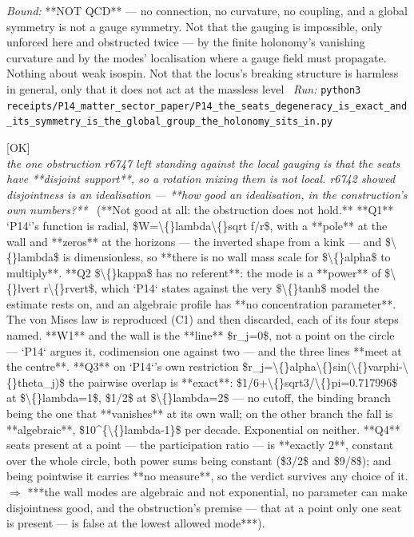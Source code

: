 \begin{description}
 \emph{Bound:}  **NOT QCD** --- no connection, no curvature, no coupling, and a global symmetry is not a gauge symmetry. Not that the gauging is impossible, only unforced here and obstructed twice --- by the finite holonomy's vanishing curvature and by the modes' localisation where a gauge field must propagate. Nothing about weak isospin. Not that the locus's breaking structure is harmless in general, only that it does not act at the massless level
\ \emph{Run:} \texttt{python3 receipts/P14\_matter\_sector\_paper/P14\_the\_seats\_degeneracy\_is\_exact\_and\_its\_symmetry\_is\_the\_global\_group\_the\_holonomy\_sits\_in.py}
\item[\rcptlabel{P14_the_walls_modes_are_algebraic_not_exponential_so_the_disjointness_obstruction_does_not_hold}{P14R91}\textbf{P14R91}\quad\texttt{P14\_the\_walls\_modes\_are\_algebraic\_not\_exponential\_so\_the\_disjointness\_obstruction\_does\_not\_hold}]\hfill\textsf{[OK]}\\
\textit{the one obstruction r6747 left standing against the local gauging is that the seats have **disjoint support**, so a rotation mixing them is not local. r6742 showed disjointness is an idealisation --- **how good an idealisation, in the construction's own numbers?**} \ (**Not good at all: the obstruction does not hold.**  **Q1** `P14`'s function is radial, \$W=\textbackslash\{\}lambda\textbackslash\{\}sqrt f/r\$, with a **pole** at the wall and **zeros** at the horizons --- the inverted shape from a kink --- and \$\textbackslash\{\}lambda\$ is dimensionless, so **there is no wall mass scale for \$\textbackslash\{\}alpha\$ to multiply**.  **Q2 \$\textbackslash\{\}kappa\$ has no referent**: the mode is a **power** of \$\textbackslash\{\}lvert r\textbackslash\{\}rvert\$, which `P14` states against the very \$\textbackslash\{\}tanh\$ model the estimate rests on, and an algebraic profile has **no concentration parameter**. The von Mises law is reproduced (C1) and then discarded, each of its four steps named.  **W1** and the wall is the **line** \$r\_j=0\$, not a point on the circle --- `P14` argues it, codimension one against two --- and the three lines **meet at the centre**.  **Q3** on `P14`'s own restriction \$r\_j=\textbackslash\{\}alpha\textbackslash\{\}sin(\textbackslash\{\}varphi-\textbackslash\{\}theta\_j)\$ the pairwise overlap is **exact**: \$1/6+\textbackslash\{\}sqrt3/\textbackslash\{\}pi=0.717996\$ at \$\textbackslash\{\}lambda=1\$, \$1/2\$ at \$\textbackslash\{\}lambda=2\$ --- no cutoff, the binding branch being the one that **vanishes** at its own wall; on the other branch the fall is **algebraic**, \$10\textasciicircum{}\{\textbackslash\{\}lambda-1\}\$ per decade. Exponential on neither.  **Q4** seats present at a point --- the participation ratio --- is **exactly 2**, constant over the whole circle, both power sums being constant (\$3/2\$ and \$9/8\$); and being pointwise it carries **no measure**, so the verdict survives any choice of it. \ensuremath{\Rightarrow} ***the wall modes are algebraic and not exponential, no parameter can make disjointness good, and the obstruction's premise --- that at a point only one seat is present --- is false at the lowest allowed mode***). 

\end{description}
